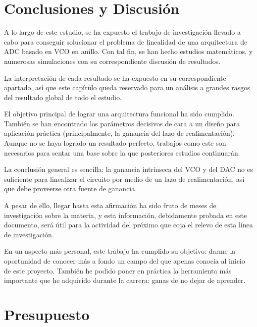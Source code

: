 \documentclass[12pt]{report} %
\begin{document}
	
	
\chapter{Conclusiones y Discusión}

	A lo largo de este estudio, se ha expuesto el trabajo de investigación llevado a cabo para conseguir solucionar el problema de linealidad de una arquitectura de ADC basado en VCO en anillo. Con tal fin, se han hecho estudios matemáticos, y numerosas simulaciones con su correspondiente discusión de resultados.
	
	La interpretación de cada resultado se ha expuesto en su correspondiente apartado, así que este capítulo queda reservado para un análisis a grandes rasgos del resultado global de todo el estudio.
	
	El objetivo principal de lograr una arquitectura funcional ha sido cumplido. También se han encontrado los parámetros decisivos de cara a un diseño para aplicación práctica (principalmente, la ganancia del lazo de realimentación). Aunque no se haya logrado un resultado perfecto, trabajos como este son necesarios para sentar una base sobre la que posteriores estudios continuarán. 
	
	La conclusión general es sencilla: la ganancia intrínseca del VCO y del DAC no es suficiente para linealizar el circuito por medio de un lazo de realimentación, así que debe proveerse otra fuente de ganancia. 
	
	A pesar de ello, llegar hasta esta afirmación ha sido fruto de meses de investigación sobre la materia, y esta información, debidamente probada en este documento, será útil para la actividad del próximo que coja el relevo de esta línea de investigación.
	
	En un aspecto más personal, este trabajo ha cumplido su objetivo: darme la oportunidad de conocer más a fondo un campo del que apenas conocía al inicio de este proyecto. También he podido poner en práctica la herramienta más importante que he adquirido durante la carrera: ganas de no dejar de aprender.
	

\chapter{Presupuesto}
\end{document}

